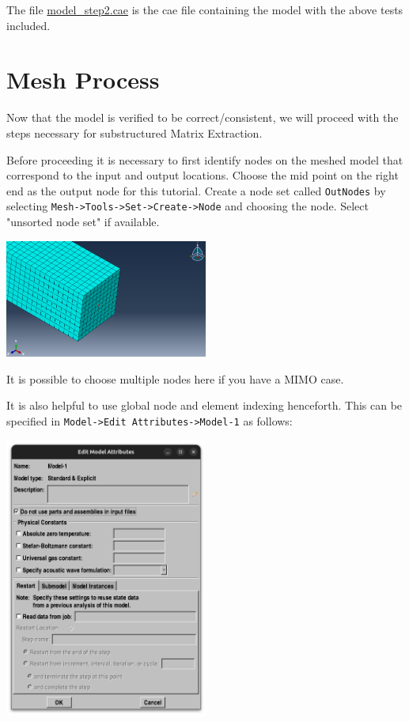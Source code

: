 \documentclass[11pt]{article}
\begin{document}
The file \href{https://github.com/Nidish96/Abaqus4Joints/blob/main/assets/assembly/model\_step2.cae}{model\_step2.cae} is the cae file containing the model with the above tests included.
\pagebreak
\section{Mesh Process}
\label{sec:meshproc}
Now that the model is verified to be correct/consistent, we will proceed with the steps necessary for substructured Matrix Extraction.

Before proceeding it is necessary to first identify nodes on the meshed model that correspond to the input and output locations.
Choose the mid point on the right end as the output node for this tutorial.
Create a node set called \texttt{OutNodes} by selecting \texttt{Mesh->Tools->Set->Create->Node} and choosing the node. Select "unsorted node set" if available.
\begin{center}
\includegraphics[width=0.5\textwidth]{./figs/outnode.png}
\end{center}
It is possible to choose multiple nodes here if you have a MIMO case.

It is also helpful to use global node and element indexing henceforth.
This can be specified in \texttt{Model->Edit Attributes->Model-1} as follows:
\begin{center}
\includegraphics[width=0.5\textwidth]{./figs/modl.png}
\end{center}
\end{document}

